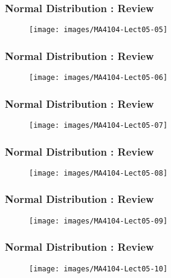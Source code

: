 \documentclass{beamer}
\begin{document}
	\begin{frame}
		\frametitle{Normal Distribution : Review}
		\begin{figure}
			\centering	
			\texttt{[image: images/MA4104-Lect05-05]}
			
		\end{figure}
	\end{frame}
	\begin{frame}
		\frametitle{Normal Distribution : Review}
		\begin{figure}
			\centering
			\texttt{[image: images/MA4104-Lect05-06]}
			
		\end{figure}
	\end{frame}
	\begin{frame}
		\frametitle{Normal Distribution : Review}
		\begin{figure}
			\centering	
			\texttt{[image: images/MA4104-Lect05-07]}
			
		\end{figure}
	\end{frame}
	\begin{frame}
		\frametitle{Normal Distribution : Review}
		\begin{figure}
			\centering
			\texttt{[image: images/MA4104-Lect05-08]}
			
		\end{figure}
	\end{frame}
	\begin{frame}
		\frametitle{Normal Distribution : Review}
		\begin{figure}
			\centering	
			\texttt{[image: images/MA4104-Lect05-09]}
			
		\end{figure}
	\end{frame}
	\begin{frame}
		\frametitle{Normal Distribution : Review}
		\begin{figure}
			\centering
			\texttt{[image: images/MA4104-Lect05-10]}
			
		\end{figure}
	\end{frame}
\end{document}
